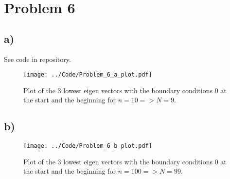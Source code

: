 \documentclass[english,notitlepage]{article}  %
\begin{document}
\section*{Problem 6}
\subsection*{a)}
See code in repository.

\begin{figure}[H]
    \centering
    \texttt{[image: ../Code/Problem\_6\_a\_plot.pdf]}
    \caption{Plot of the 3 lowest eigen vectors with the boundary conditions 0 at the start and the beginning for $n=10=>N=9$.}
    \label{fig:6aplot}
\end{figure}

\subsection*{b)}

\begin{figure}[H]
    \centering
    \texttt{[image: ../Code/Problem\_6\_b\_plot.pdf]}
    \caption{Plot of the 3 lowest eigen vectors with the boundary conditions 0 at the start and the beginning for $n=100=>N=99$.}
    \label{fig:6bplot}
\end{figure}
\end{document}
